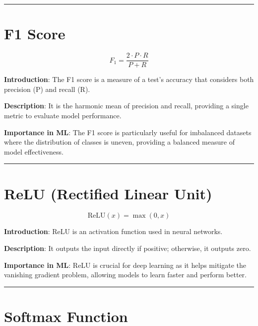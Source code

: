 \documentclass[
  12 pt,
  a4paper,
]{book}
\numberwithin{equation}{section}
\theoremstyle{plain}      %
\theoremstyle{definition} %
\theoremstyle{remark}     %
\theoremstyle{note}         %
\begin{document}
\begin{center}\rule{0.5\linewidth}{0.5pt}\end{center}

\newpage

\hypertarget{f1-score}{%
\chapter{F1 Score}\label{f1-score}}

\[
F_1 = \frac{2 \cdot P \cdot R}{P + R}
\]

\textbf{Introduction}: The F1 score is a measure of a test's accuracy
that considers both precision (P) and recall (R).

\textbf{Description}: It is the harmonic mean of precision and recall,
providing a single metric to evaluate model performance.

\textbf{Importance in ML}: The F1 score is particularly useful for
imbalanced datasets where the distribution of classes is uneven,
providing a balanced measure of model effectiveness.

\begin{center}\rule{0.5\linewidth}{0.5pt}\end{center}

\newpage

\hypertarget{relu-rectified-linear-unit}{%
\chapter{ReLU (Rectified Linear
Unit)}\label{relu-rectified-linear-unit}}

\[
\text{ReLU}(x) = \max(0, x)
\]

\textbf{Introduction}: ReLU is an activation function used in neural
networks.

\textbf{Description}: It outputs the input directly if positive;
otherwise, it outputs zero.

\textbf{Importance in ML}: ReLU is crucial for deep learning as it helps
mitigate the vanishing gradient problem, allowing models to learn faster
and perform better.

\begin{center}\rule{0.5\linewidth}{0.5pt}\end{center}

\newpage

\hypertarget{softmax-function}{%
\chapter{Softmax Function}\label{softmax-function}}
\end{document}

